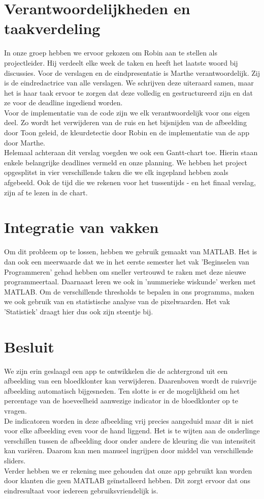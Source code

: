 \documentclass[a4paper,kulak]{kulakarticle}
\begin{document}
\section{Verantwoordelijkheden en taakverdeling}		
In onze groep hebben we ervoor gekozen om Robin aan te stellen als projectleider. Hij verdeelt elke week de taken en heeft het laatste woord bij discussies. 
Voor de verslagen en de eindpresentatie is Marthe verantwoordelijk. Zij is de eindredactrice van alle verslagen. We schrijven deze uiteraard samen, maar het is haar taak ervoor te zorgen dat deze volledig en gestructureerd zijn en dat ze voor de deadline ingediend worden.\\
Voor de implementatie van de code zijn we elk verantwoordelijk voor ons eigen deel. Zo wordt het verwijderen van de ruis en het bijsnijden van de afbeelding door Toon geleid, de kleurdetectie door Robin en de implementatie van de app door Marthe.\\
Helemaal achteraan dit verslag voegden we ook een Gantt-chart toe. Hierin staan enkele belangrijke deadlines vermeld en onze planning. We hebben het project opgesplitst in vier verschillende taken die we elk ingepland hebben zoals afgebeeld. Ook de tijd die we rekenen voor het tussentijds - en het finaal verslag, zijn af te lezen in de chart.

\section{Integratie van vakken}
Om dit probleem op te lossen, hebben we gebruik gemaakt van MATLAB. Het is dan ook een meerwaarde dat we in het eerste semester het vak 'Beginselen van Programmeren' gehad hebben om sneller vertrouwd te raken met deze nieuwe programmeertaal. Daarnaast leren we ook in 'nummerieke wiskunde' werken met MATLAB. Om de verschillende thresholds te bepalen in ons programma, maken we ook gebruik van en statistische analyse van de pixelwaarden. Het vak 'Statistiek' draagt hier dus ook zijn steentje bij.

\section{Besluit}	
We zijn erin geslaagd een app te ontwikkelen die de achtergrond uit een afbeelding van een bloedklonter kan verwijderen. Daarenboven wordt de ruisvrije afbeelding automatisch bijgesneden. Ten slotte is er de mogelijkheid om het percentage van de hoeveelheid aanwezige indicator in de bloedklonter op te vragen.\\ 
De indicatoren worden in deze afbeelding vrij precies aangeduid maar dit is niet voor elke afbeelding even voor de hand liggend. Het is te wijten aan de onderlinge verschillen tussen de afbeelding door onder andere de kleuring die van intensiteit kan variëren. Daarom kan men manueel ingrijpen door middel van verschillende sliders. \\ 
Verder hebben we er rekening mee gehouden dat onze app gebruikt kan worden door klanten die geen MATLAB geïnstalleerd hebben. Dit zorgt ervoor dat ons eindresultaat voor iedereen gebruiksvriendelijk is.

\newpage




\end{document}
